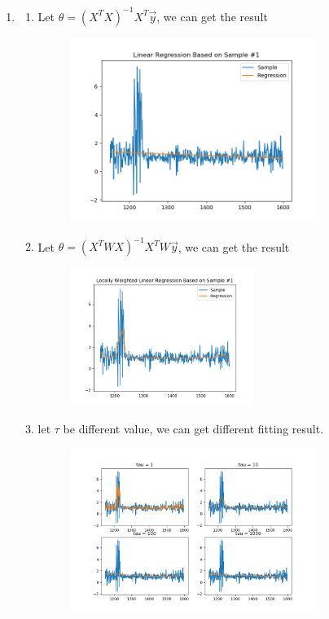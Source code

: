 \documentclass[12pt]{article}
\begin{document}
\begin{enumerate}[label=(\alph*)]
    \item
    \begin{enumerate}[label=(\roman*)]
        \item
        Let $\theta = (X^TX)^{-1}X^T \vec{y}$, we can get the result
        \begin{figure}[H]
            \centering
            \includegraphics[width=0.80\textwidth]{figure/Regression4Quasar/b_i.png}
        \end{figure}
        \item
        Let $\theta = (X^TWX)^{-1}X^TW \vec{y}$, we can get the result
        \begin{figure}[H]
            \centering
            \includegraphics[width=0.60\textwidth]{figure/Regression4Quasar/b_ii.png}
        \end{figure}
        \item
        let $\tau$ be different value, we can get different fitting result.
        \begin{figure}[H]
            \centering
            \includegraphics[width=0.80\textwidth]{figure/Regression4Quasar/b_iii.png}

\end{figure}
\end{enumerate}
\end{enumerate}
\end{document}
